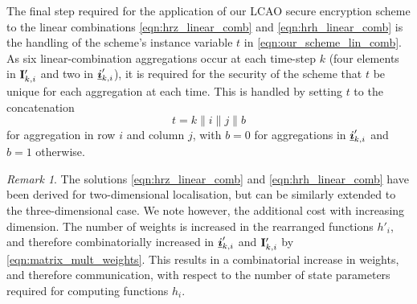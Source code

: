 \documentclass[10pt,journal,compsoc]{IEEEtran}
\theoremstyle{definition}
\theoremstyle{definition}
\theoremstyle{remark}
\newtheorem*{remark}{Remark}
\begin{document}
The final step required for the application of our LCAO secure encryption scheme to the linear combinations \eqref{eqn:hrz_linear_comb} and \eqref{eqn:hrh_linear_comb} is the handling of the scheme's instance variable $t$ in \eqref{eqn:our_scheme_lin_comb}. As six linear-combination aggregations occur at each time-step $k$ (four elements in ${{\mathbf{I}}}'_{k,i}$ and two in ${\boldsymbol{\underline{i}}}'_{k,i}$), it is required for the security of the scheme that $t$ be unique for each aggregation at each time. This is handled by setting $t$ to the concatenation 
\begin{equation}
    t=k\mathbin\|i\mathbin\|j\mathbin\|b
\end{equation}
for aggregation in row $i$ and column $j$, with $b=0$ for aggregations in ${\boldsymbol{\underline{i}}}'_{k,i}$ and $b=1$ otherwise.
\begin{remark}
    The solutions \eqref{eqn:hrz_linear_comb} and \eqref{eqn:hrh_linear_comb} have been derived for two-dimensional localisation, but can be similarly extended to the three-dimensional case. We note however, the additional cost with increasing dimension. The number of weights is increased in the rearranged functions $h'_i$, and therefore combinatorially increased in ${\boldsymbol{\underline{i}}}'_{k,i}$ and ${{\mathbf{I}}}'_{k,i}$ by \eqref{eqn:matrix_mult_weights}. This results in a combinatorial increase in weights, and therefore communication, with respect to the number of state parameters required for computing functions $h_i$.
\end{remark}

% 
% 
\end{document}

